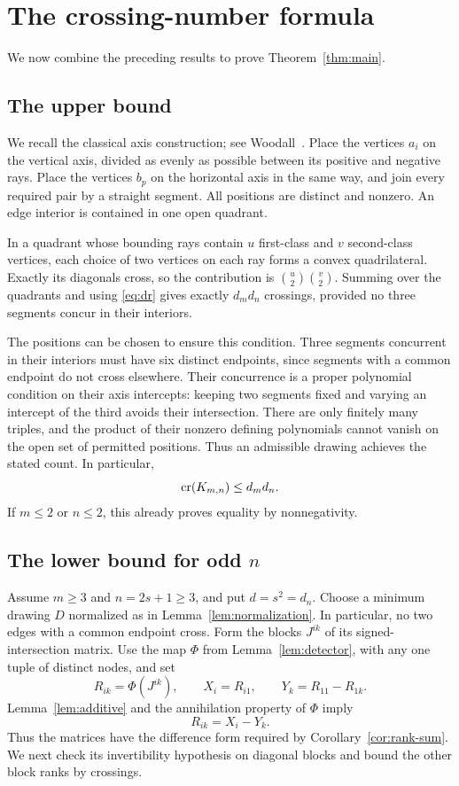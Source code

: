 \section{The crossing-number formula}
\label{sec:formula}

We now combine the preceding results to prove Theorem~\ref{thm:main}.

\subsection{The upper bound}
We recall the classical axis construction; see
Woodall~\cite[p.~658]{Woodall1993}.
Place the vertices $a_i$ on the vertical axis, divided as evenly as
possible between its positive and negative rays. Place the vertices $b_p$
on the horizontal axis in the same way, and join every required pair by
a straight segment. All positions are distinct and nonzero.
An edge interior is contained in one open quadrant.

In a quadrant whose bounding rays contain $u$ first-class and $v$
second-class vertices, each choice of two vertices on each ray forms a
convex quadrilateral. Exactly its diagonals cross, so the contribution is
$\binom u2\binom v2$.
Summing over the quadrants and using \eqref{eq:dr} gives exactly
$d_m d_n$ crossings, provided no three segments concur in their interiors.

The positions can be chosen to ensure this condition. Three segments
concurrent in their interiors must have six distinct endpoints, since
segments with a common endpoint do not cross elsewhere. Their concurrence
is a proper polynomial condition on their axis intercepts: keeping two
segments fixed and varying an intercept of the third avoids their
intersection. There are only finitely many triples, and the product of
their nonzero defining polynomials cannot vanish on the open set of
permitted positions. Thus an admissible drawing achieves the stated count.
In particular,
\begin{equation}
\label{eq:upper}
 \operatorname{cr}(K_{m,n})\le d_m d_n.
\end{equation}
If $m\le2$ or $n\le2$, this already proves equality by nonnegativity.

\subsection{The lower bound for odd \texorpdfstring{$n$}{n}}
Assume $m\ge3$ and $n=2s+1\ge3$, and put $d=s^2=d_n$.
Choose a minimum drawing $D$ normalized as in
Lemma~\ref{lem:normalization}. In particular, no two edges with a common
endpoint cross. Form the blocks $J^{ik}$ of its signed-intersection matrix.
Use the map $\Phi$ from Lemma~\ref{lem:detector}, with any one tuple of
distinct nodes, and set
\[
 R_{ik}=\Phi(J^{ik}),\qquad
 X_i=R_{i1},\qquad Y_k=R_{11}-R_{1k}.
\]
Lemma~\ref{lem:additive} and the annihilation property of $\Phi$ imply
\begin{equation}
\label{eq:rank-family}
 R_{ik}=X_i-Y_k.
\end{equation}
Thus the matrices have the difference form required by
Corollary~\ref{cor:rank-sum}.  We next check its invertibility hypothesis
on diagonal blocks and bound the other block ranks by crossings.

